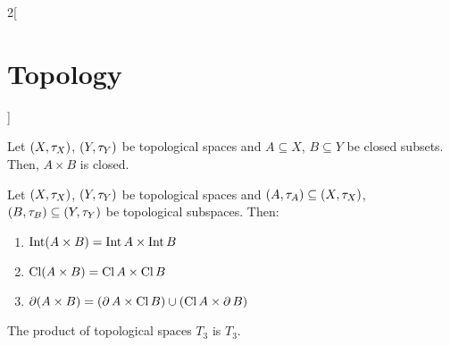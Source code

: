 \documentclass[../../../main.tex]{subfiles}
\begin{document}
\begin{multicols}{2}[\section{Topology}]
  \begin{prop}
    Let $(X,\tau_X)$, $(Y,\tau_Y)$ be topological spaces and $A\subseteq X$, $B\subseteq Y$ be closed subsets. Then, $A\times B$ is closed.
  \end{prop}
  \begin{prop}
    Let $(X,\tau_X)$, $(Y,\tau_Y)$ be topological spaces and $(A,\tau_A)\subseteq (X,\tau_X)$, $(B,\tau_B)\subseteq (Y,\tau_Y)$ be topological subspaces. Then:
    \begin{enumerate}
      \item $\operatorname{Int}(A\times B)=\operatorname{Int} A\times \operatorname{Int} B$
      \item $\operatorname{Cl}(A\times B)=\operatorname{Cl} A\times \operatorname{Cl} B$
      \item $\operatorname{\partial}(A\times B)=(\operatorname{\partial} A\times\operatorname{Cl} B)\cup(\operatorname{Cl} A\times \operatorname{\partial} B)$
    \end{enumerate}
  \end{prop}
  \begin{theorem}
    The product of topological spaces $T_3$ is $T_3$.
  \end{theorem}

\end{multicols}
\end{document}
